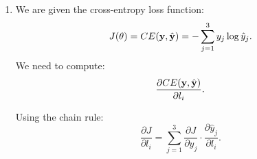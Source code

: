 \begin{parts}
{\begin{enumerate}[label=\roman*.]
{            Next, differentiating $\mathbf{z}$:
            $$
            \frac{\partial z_i}{\partial x_j} = W_{ji}
            $$

            Combining both:
            $$
            \frac{\partial h_i}{\partial x_j} =
            \begin{cases}
            W_{ji} & \text{if } z_i > 0 \\
            0 & \text{if } z_i \leq 0
            \end{cases}
            $$

            \paragraph{Dimension Check:}
            Let:
            \begin{itemize}
                \item $\bx \in \mathbb{R}^{1 \times dm}$, the input row vector.
                \item $\bW \in \mathbb{R}^{dm \times h}$, the weight matrix.
                \item $\bb_1 \in \mathbb{R}^{h}$, the bias vector.
                \item $\bh \in \mathbb{R}^{1 \times h}$, the hidden layer output.
            \end{itemize}

            Since:
            $$
            \bz = \bx \bW + \bb_1
            $$
            we verify:
            $$
            (1 \times dm) \times (dm \times h) = (1 \times h),
            $$
            so the dimensions are consistent.

            The derivative:
            $$
            \frac{\partial z_i}{\partial x_j} = W_{ji}
            $$
            holds since $W_{ji}$ correctly maps index $j$ of $\bx$ to index $i$ of $\bz$.
        }

        \item {
            We are given the cross-entropy loss function:
            $$
            J(\theta) = CE(\mathbf{y}, \hat{\mathbf{y}}) = -\sum_{j=1}^{3} y_j \log \hat{y}_j.
            $$
            We need to compute:
            $$
            \frac{\partial CE(\mathbf{y}, \hat{\mathbf{y}})}{\partial l_i}.
            $$

            Using the chain rule:
            $$
            \frac{\partial J}{\partial l_i} = \sum_{j=1}^{3} \frac{\partial J}{\partial \hat{y}_j} \cdot \frac{\partial \hat{y}_j}{\partial l_i}.
            $$

}
\end{enumerate}}
\end{parts}
